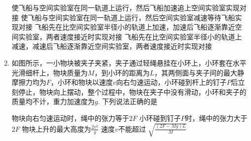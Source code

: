\begin{enumerate}[leftmargin=0em]
\fourchoices
{使飞船与空间实验室在同一轨道上运行，然后飞船加速追上空间实验室实现对接}
{使飞船与空间实验室在同一轨道上运行，然后空间实验室减速等待飞船实现对接}
{飞船先在比空间实验室半径小的轨道上加速，加速后飞船逐渐靠近空间实验室，两者速度接近时实现对接}
{飞船先在比空间实验室半径小的轨道上减速，减速后飞船逐渐靠近空间实验室，两者速度接近时实现对接}





\item 
{}
如图所示，一小物块被夹子夹紧，夹子通过轻绳悬挂在小环上，小环套在水平光滑细杆上，物块质量为$ M $，到小环的距离为$ L $，其两侧面与夹子间的最大静摩擦力均为$ F $，小环和物块以速度$ v $向右匀速运动，小环碰到杆上的钉子$ P $后立刻停止，物块向上摆动，整个过程中，物块在夹子中没有滑动，小环和夹子的质量均不计，重力加速度为$ g $. 下列说法正确的是  
\begin{figure}[h!]
\centering

\end{figure}

\fourchoices
{物块向右匀速运动时，绳中的张力等于$ 2F $}
{小环碰到钉子$ P $时，绳中的张力大于$ 2F $}
{物块上升的最大高度为$\frac { 2 v ^ { 2 } } { g }$}
{速度$ v $不能超过 $\sqrt { \frac { ( 2 F - M g ) L } { M } }$}









\end{enumerate}

